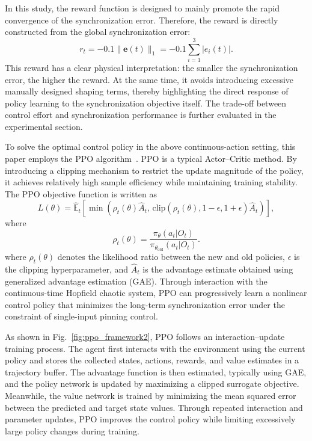 \documentclass[10pt,twocolumn]{article}
\theoremstyle{definition}
\begin{document}
In this study, the reward function is designed to mainly promote the rapid convergence of the synchronization error. Therefore, the reward is directly constructed from the global synchronization error:
\begin{equation}
	r_t
	=
	-0.1\|\mathbf{e}(t)\|_1
	=
	-0.1\sum_{i=1}^{3}|e_i(t)|.
	\label{eq:reward_function}
\end{equation}
This reward has a clear physical interpretation: the smaller the synchronization error, the higher the reward. At the same time, it avoids introducing excessive manually designed shaping terms, thereby highlighting the direct response of policy learning to the synchronization objective itself. The trade-off between control effort and synchronization performance is further evaluated in the experimental section.

To solve the optimal control policy in the above continuous-action setting, this paper employs the PPO algorithm~\cite{schulman2017proximal}. PPO is a typical Actor--Critic method. By introducing a clipping mechanism to restrict the update magnitude of the policy, it achieves relatively high sample efficiency while maintaining training stability. The PPO objective function is written as
\begin{equation}
	L(\theta)
	=
	\hat{\mathbb{E}}_t
	\left[
	\min
	\left(
	\rho_t(\theta)\hat{A}_t,\,
	\mathrm{clip}
	\left(
	\rho_t(\theta),1-\epsilon,1+\epsilon
	\right)
	\hat{A}_t
	\right)
	\right],
	\label{eq:ppo_objective}
\end{equation}
where
\begin{equation}
	\rho_t(\theta)
	=
	\frac{\pi_\theta(a_t|O_t)}
	{\pi_{\theta_{\mathrm{old}}}(a_t|O_t)}.
	\label{eq:ppo_ratio}
\end{equation}
where $\rho_t(\theta)$ denotes the likelihood ratio between the new and old policies, $\epsilon$ is the clipping hyperparameter, and $\hat{A}_t$ is the advantage estimate obtained using generalized advantage estimation (GAE). Through interaction with the continuous-time Hopfield chaotic system, PPO can progressively learn a nonlinear control policy that minimizes the long-term synchronization error under the constraint of single-input pinning control.

As shown in Fig.~\ref{fig:ppo_framework2}, PPO follows an interaction--update training process. The agent first interacts with the environment using the current policy and stores the collected states, actions, rewards, and value estimates in a trajectory buffer. The advantage function is then estimated, typically using GAE, and the policy network is updated by maximizing a clipped surrogate objective. Meanwhile, the value network is trained by minimizing the mean squared error between the predicted and target state values. Through repeated interaction and parameter updates, PPO improves the control policy while limiting excessively large policy changes during training.
\end{document}

